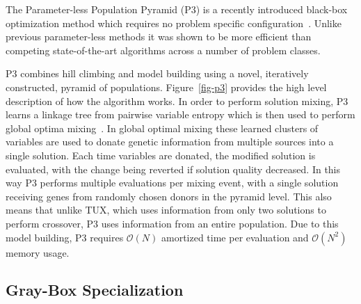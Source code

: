 \documentclass{sig-alternate}
\newcommand{\BigO}[1]{$\mathcal{O}{(#1)}$}
\begin{document}
The Parameter-less Population Pyramid (P3) is a recently introduced
black-box optimization method which requires no problem specific configuration~\cite{goldman:2014:p3}.
Unlike previous parameter-less methods it was shown to be more efficient than
competing state-of-the-art algorithms across a number of problem classes.

P3 combines hill climbing and model building using a novel, iteratively constructed, pyramid
of populations. Figure~\ref{fig-p3} provides the high level description of how the algorithm
works. In order to perform solution mixing, P3 learns a linkage tree from pairwise variable
entropy which is then used to perform global optima mixing~\cite{thierens:2011:gomea}. In global
optimal mixing these learned clusters of variables are used to donate genetic information from multiple
sources into a single solution. Each time variables are donated, the modified solution is evaluated,
with the change being reverted if solution quality decreased. In this way P3 performs
multiple evaluations per mixing event, with a single solution receiving genes from randomly chosen
donors in the pyramid level. This also means that unlike TUX, which uses information from only two
solutions to perform crossover, P3 uses information from an entire population.
Due to this model building, P3 requires \BigO{N} amortized time per evaluation and \BigO{N^2}
memory usage.

\subsection{Gray-Box Specialization}
\begin{comment}
\begin{figure}
  \begin{algorithmic}[1]
  \Procedure{SubfunctionTree}{}
    \State $clusters \leftarrow [\{0\}, \{1\}, \{2\}, \dots, \{N-1\}]$
    \State $cluster\_number \leftarrow [0 .. N-1]$
    \ForAll{$subfunction \in shuffled(subfunctions)$}
      \State $to\_merge \leftarrow \emptyset$
      \ForAll{$b \in subfunction$}
        \State $to\_merge \leftarrow to\_merge \cup \{cluster\_number[b]\}$
      \EndFor
      \If{$|to\_merge| > 1$}
        \State $new\_cluster \leftarrow \emptyset$
        \ForAll{$i \in to\_merge$}
          \State $new\_cluster \leftarrow new\_cluster \cup clusters[i]$
        \EndFor
        \ForAll{$b \in new\_cluster$}
          \State $cluster\_number[b] \leftarrow |clusters|$
        \EndFor
        \State $clusters \leftarrow clusters + new\_cluster$
      \EndIf
    \EndFor
    \State Remove first $N~clusters$
    \State Remove any cluster containing all variables
  \EndProcedure
\end{algorithmic}
  \caption{Algorithm used to convert a list of subfunctions into linkage tree clusters.}
  \label{fig-sfx-tree}
\end{figure}
\end{comment}
\end{document}
